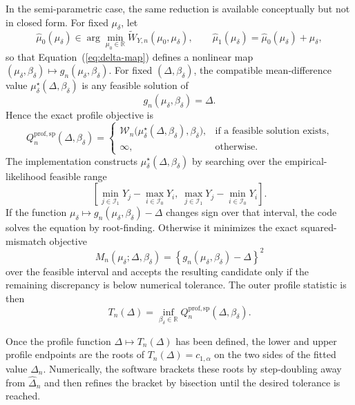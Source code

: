 \documentclass[11pt]{article}
\begin{document}
In the semi-parametric case, the same reduction is available conceptually but not in closed form. For fixed $\mu_\delta$, let
\[
  \widehat{\mu}_0(\mu_\delta)
  \in
  \arg\min_{\mu_0 \in \mathbb{R}} \widetilde{W}_{Y,n}(\mu_0,\mu_\delta),
  \qquad
  \widehat{\mu}_1(\mu_\delta)
  =
  \widehat{\mu}_0(\mu_\delta) + \mu_\delta,
\]
so that Equation~(\ref{eq:delta-map}) defines a nonlinear map $(\mu_\delta,\beta_\delta) \mapsto g_n(\mu_\delta,\beta_\delta)$. For fixed $(\Delta,\beta_\delta)$, the compatible mean-difference value $\mu_\delta^{\star}(\Delta,\beta_\delta)$ is any feasible solution of
\[
  g_n(\mu_\delta,\beta_\delta) = \Delta.
\]
Hence the exact profile objective is
\begin{equation}
  Q^{\mathrm{prof,sp}}_n(\Delta,\beta_\delta)
  =
  \begin{cases}
    \mathcal{W}_n\bigl(\mu_\delta^{\star}(\Delta,\beta_\delta),\beta_\delta\bigr),
    & \text{if a feasible solution exists},\\[0.6em]
    \infty,
    & \text{otherwise}.
  \end{cases}
  \label{eq:delta-profile-semiparametric-objective}
\end{equation}
The implementation constructs $\mu_\delta^{\star}(\Delta,\beta_\delta)$ by searching over the empirical-likelihood feasible range
\[
  \left[
    \min_{j \in \mathcal{I}_1} Y_j - \max_{i \in \mathcal{I}_0} Y_i,\;
    \max_{j \in \mathcal{I}_1} Y_j - \min_{i \in \mathcal{I}_0} Y_i
  \right].
\]
If the function $\mu_\delta \mapsto g_n(\mu_\delta,\beta_\delta) - \Delta$ changes sign over that interval, the code solves the equation by root-finding. Otherwise it minimizes the exact squared-mismatch objective
\begin{equation}
  M_n(\mu_\delta;\Delta,\beta_\delta)
  =
  \left\{g_n(\mu_\delta,\beta_\delta) - \Delta\right\}^2
  \label{eq:delta-profile-semiparametric-inner-objective}
\end{equation}
over the feasible interval and accepts the resulting candidate only if the remaining discrepancy is below numerical tolerance. The outer profile statistic is then
\begin{equation}
  T_n(\Delta)
  =
  \inf_{\beta_\delta \in \mathbb{R}}
  Q^{\mathrm{prof,sp}}_n(\Delta,\beta_\delta).
  \label{eq:delta-profile-semiparametric-outer}
\end{equation}

Once the profile function $\Delta \mapsto T_n(\Delta)$ has been defined, the lower and upper profile endpoints are the roots of $T_n(\Delta) = c_{1,\alpha}$ on the two sides of the fitted value $\widehat{\Delta}_n$. Numerically, the software brackets these roots by step-doubling away from $\widehat{\Delta}_n$ and then refines the bracket by bisection until the desired tolerance is reached.
\end{document}

